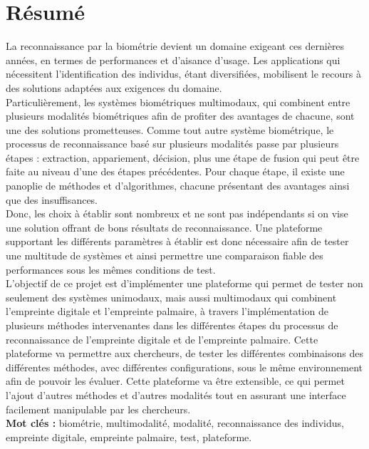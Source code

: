 \chapter*{Résumé}%


\tab La reconnaissance par la biométrie devient un domaine exigeant ces dernières années, en termes de performances et d’aisance d’usage. Les applications qui nécessitent l’identification des individus, étant diversifiées, mobilisent le recours à des solutions adaptées aux exigences du domaine.\\
\tab Particulièrement, les systèmes biométriques multimodaux, qui combinent entre plusieurs modalités biométriques afin de profiter des avantages de chacune, sont une des solutions prometteuses. Comme tout autre système biométrique, le processus de reconnaissance basé sur plusieurs modalités passe par plusieurs étapes : extraction, appariement, décision, plus une étape de fusion qui peut être faite au niveau d’une des étapes précédentes. Pour chaque étape, il existe une panoplie de méthodes et d’algorithmes, chacune présentant des avantages ainsi que des insuffisances.
\\ \tab Donc, les choix à établir sont nombreux et ne sont pas indépendants si on vise une solution offrant de bons résultats de reconnaissance. Une plateforme supportant les différents paramètres à établir est donc nécessaire afin de tester une multitude de systèmes et ainsi permettre une comparaison fiable des performances sous les mêmes conditions de test. \\
\tab L’objectif de ce projet est d’implémenter une plateforme qui permet de tester non seulement des systèmes unimodaux, mais aussi multimodaux qui combinent l’empreinte digitale et l’empreinte palmaire, à travers l’implémentation de plusieurs méthodes intervenantes dans les différentes étapes du processus de reconnaissance de l’empreinte digitale et de l’empreinte palmaire. Cette plateforme va permettre aux chercheurs, de tester les différentes combinaisons des différentes méthodes, avec différentes configurations, sous le même environnement afin de pouvoir les évaluer. Cette plateforme va être extensible, ce qui permet l’ajout d’autres méthodes et d’autres modalités tout en assurant une interface facilement manipulable par les chercheurs. \\
\tab \textbf{Mot clés :} biométrie, multimodalité, modalité, reconnaissance des individus, empreinte digitale, empreinte palmaire, test, plateforme.



